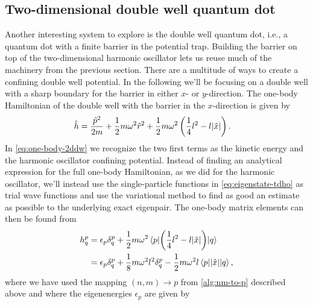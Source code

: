     \subsection{Two-dimensional double well quantum dot}
        Another interesting system to explore is the double well quantum dot,
        i.e., a quantum dot with a finite barrier in the potential trap.
        Building the barrier on top of the two-dimensional harmonic oscillator
        lets us reuse much of the machinery from the previous section.
        There are a multitude of ways to create a confining double well
        potential.
        In the following we'll be focusing on a double well with a sharp
        boundary for the barrier in either $x$- or $y$-direction.
        The one-body Hamiltonian of the double well with the barrier in the
        $x$-direction is given by
        \begin{align}
            \onehamil
            &=
            \frac{\momentum^2}{2m}
            + \half m \omega^2 \position[r]^2
            + \half m \omega^2 \para{
                \frac{1}{4} l^2 - l\abs{\position}
            }.
            \label{eq:one-body-2ddw}
        \end{align}
        In \autoref{eq:one-body-2ddw} we recognize the two first terms as the
        kinetic energy and the harmonic oscillator confining potential.
        Instead of finding an analytical expression for the full one-body
        Hamiltonian, as we did for the harmonic oscillator, we'll instead use
        the single-particle functions in \autoref{eq:eigenstate-tdho} as trial
        wave functions and use the variational method to find as good an
        estimate as possible to the underlying exact eigenpair.
        The one-body matrix elements can then be found from
        \begin{align}
            h^{p}_{q}
            &= \epsilon_{p}\delta^{p}_{q}
            + \frac{1}{2} m \omega^2\mel{p}{\left( 
                \frac{1}{4} l^2 - l \abs{\hat{x}}
             \right)}{q}
            \\
            &= \epsilon_{p}\delta^{p}_{q}
            + \frac{1}{8} m \omega^2 l^2 \delta^{p}_{q}
            - \frac{1}{2} m \omega^2 l \mel{p}{\abs{\hat{x}}}{q},
        \end{align}
        where we have used the mapping $(n, m) \to p$ from
        \autoref{alg:nm-to-p} described above and where
        the eigenenergies $\epsilon_p$ are given by
